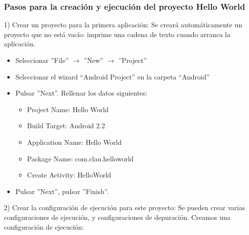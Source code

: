\documentclass[hyperref={pdfpagelabels=true},utf8x]{beamer}
\begin{document}
\begin{frame}[shrink=55.9]
\frametitle{Pasos para la creación y ejecución del proyecto Hello World}

\begin{block}{1) Crear un proyecto para la primera aplicación:}
Se creará automáticamente un proyecto que no está vacío: imprime una
cadena de texto cuando arranca la aplicación.
\end{block}

\begin{itemize}
    \item Seleccionar ''File'' $\rightarrow$ ''New'' $\rightarrow$ ''Project''
    \item Seleccionar el wizard ``Android Project'' en la carpeta ``Android''
    \item Pulsar ''Next''. Rellenar los datos siguientes:
    \begin{itemize}
          \item Project Name: Hello World
          \item Build Target: Android 2.2
          \item Application Name: Hello World
          \item Package Name: com.clau.helloworld
          \item Create Activity: HelloWorld
    \end{itemize}
    \item Pulsar ''Next'', pulsar ''Finish''.
\end{itemize}

\begin{block}{2) Crear la configuración de ejecución para este proyecto:}
Se pueden crear varias configuraciones de ejecución, y configuraciones
de depuración. Creamos una configuración de ejecución:
\end{block}


\end{frame}
\end{document}
